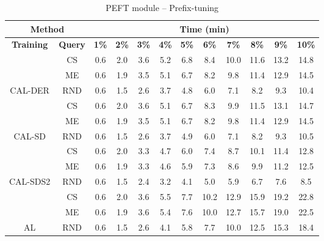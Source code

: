 \begin{table}[htbp]
\begin{subtable}{\linewidth}
\begin{tabular}{c|c|cccccccccc}
\toprule
\multicolumn{2}{c|}{\textbf{Method}} & \multicolumn{10}{c}{\textbf{Time (min)}} \\
\midrule
\textbf{Training} & \textbf{Query} & \textbf{1\%} & \textbf{2\%} & \textbf{3\%} & \textbf{4\%} & \textbf{5\%} & \textbf{6\%} & \textbf{7\%} & \textbf{8\%} & \textbf{9\%} & \textbf{10\%}\\
\midrule
 & CS & 0.6 & 2.0 & 3.6 & 5.2 & 6.8 & 8.4 & 10.0 & 11.6 & 13.2 & 14.8\\

 & ME & 0.6 & 1.9 & 3.5 & 5.1 & 6.7 & 8.2 & 9.8 & 11.4 & 12.9 & 14.5\\

\multirow{-3}{*}{\raggedright\arraybackslash CAL-DER} & RND & 0.6 & 1.5 & 2.6 & 3.7 & 4.8 & 6.0 & 7.1 & 8.2 & 9.3 & 10.4\\
\midrule
 & CS & 0.6 & 2.0 & 3.6 & 5.1 & 6.7 & 8.3 & 9.9 & 11.5 & 13.1 & 14.7\\

 & ME & 0.6 & 1.9 & 3.5 & 5.1 & 6.7 & 8.2 & 9.8 & 11.4 & 12.9 & 14.5\\

\multirow{-3}{*}{\raggedright\arraybackslash CAL-SD} & RND & 0.6 & 1.5 & 2.6 & 3.7 & 4.9 & 6.0 & 7.1 & 8.2 & 9.3 & 10.5\\
\midrule
 & CS & 0.6 & 2.0 & 3.3 & 4.7 & 6.0 & 7.4 & 8.7 & 10.1 & 11.4 & 12.8\\

 & ME & 0.6 & 1.9 & 3.3 & 4.6 & 5.9 & 7.3 & 8.6 & 9.9 & 11.2 & 12.5\\

\multirow{-3}{*}{\raggedright\arraybackslash CAL-SDS2} & RND & 0.6 & 1.5 & 2.4 & 3.2 & 4.1 & 5.0 & 5.9 & 6.7 & 7.6 & 8.5\\
\midrule
 & CS & 0.6 & 2.0 & 3.6 & 5.5 & 7.7 & 10.2 & 12.9 & 15.9 & 19.2 & 22.8\\

 & ME & 0.6 & 1.9 & 3.6 & 5.4 & 7.6 & 10.0 & 12.7 & 15.7 & 19.0 & 22.5\\

\multirow{-3}{*}{\raggedright\arraybackslash AL} & RND & 0.6 & 1.5 & 2.6 & 4.1 & 5.8 & 7.7 & 10.0 & 12.5 & 15.3 & 18.4\\
\bottomrule
\end{tabular}
\end{subtable}
\vspace{1em}
\begin{subtable}{\linewidth}
\centering
\caption{PEFT module -- Prefix-tuning}


\end{subtable}
\end{table}
